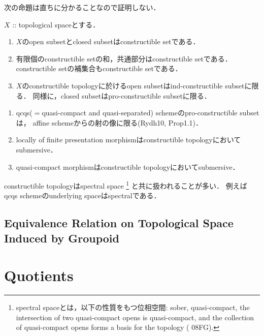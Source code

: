 \documentclass[a4paper, dvipdfmx]{jsarticle}
\begin{document}
次の命題は直ちに分かることなので証明しない．
\begin{Prop}
    $X$ :: topological spaceとする．
    \begin{enumerate}
    \item
        $X$のopen subsetとclosed subsetはconstructible setである．

    \item
        有限個のconstructible setの和，共通部分はconstructible setである．
        constructible setの補集合もconstructible setである．

    \item
        $X$のconstructible topologyに於けるopen subsetはind-constructible subsetに限る．
        同様に，closed subsetはpro-constructible subsetに限る．
    \end{enumerate}
\end{Prop}

\begin{Prop}
    \begin{enumerate}
    \item 
        qcqs($=$quasi-compact and quasi-separated) schemeのpro-constructible subsetは，
        affine schemeからの射の像に限る(Rydh10, Prop1.1)．

    \item
        locally of finite presentation morphismはconstructible topologyにおいてsubmersive．

    \item
         quasi-compact morphismはconstructible topologyにおいてsubmersive．
    \end{enumerate}
\end{Prop}

constructible topologyはspectral space
\footnote
{
    spectral spaceとは，以下の性質をもつ位相空間:
    sober, quasi-compact,
    the intersection of two quasi-compact opens is quasi-compact,
    and the collection of quasi-compact opens forms a basis for the topology
    (\cite{SP} 08FG).
}
と共に扱われることが多い．
例えばqcqs schemeのunderlying spaceはspectralである．

\subsection{Equivalence Relation on Topological Space Induced by Groupoid}

\section{Quotients}
\end{document}
